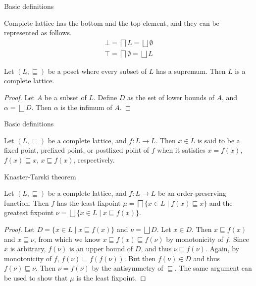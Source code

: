 \documentclass[9pt]{beamer}
\begin{document}
\begin{frame}{Basic definitions}
  \begin{lemma}
    Complete lattice has the bottom and the top element, and they can be represented as follows.
    $$
      \begin{aligned}
        \bot = \bigsqcap L         = \bigsqcup \emptyset \\
        \top = \bigsqcap \emptyset = \bigsqcup L
      \end{aligned}
    $$
  \end{lemma}

  \begin{lemma}
    Let $(L,\sqsubseteq)$ be a poset where every subset of $L$ has a supremum. Then $L$ is a complete lattice.
  \end{lemma}
  \begin{proof}
    Let $A$ be a subset of $L$.
    Define $D$ as the set of lower bounds of $A$, and $\alpha = \bigsqcup D$.
    Then $\alpha$ is the infimum of $A$.
  \end{proof}
\end{frame}

\begin{frame}{Basic definitions}
  \begin{definition}
    Let $(L,\sqsubseteq)$ be a complete lattice, and $f : L \to L$.
    Then $x \in L$ is said to be a fixed point, prefixed point, or postfixed point of $f$ when
    it satisfies $x = f(x)$, $f(x) \sqsubseteq x$, $x \sqsubseteq f(x)$, respectively.
  \end{definition}
\end{frame}

\begin{frame}{Knaster-Tarski theorem}
  \begin{lemma}
    Let $(L,\sqsubseteq)$ be a complete lattice, and $f : L \to L$ be an order-preserving function.
    Then $f$ has the least fixpoint $\mu = \bigsqcap \{x \in L \mid f(x) \sqsubseteq x\}$
    and the greatest fixpoint $\nu = \bigsqcup \{x \in L \mid x \sqsubseteq f(x)\}$.
  \end{lemma}
  \begin{proof}
    Let $D = \{x \in L \mid x \sqsubseteq f(x)\}$ and $\nu = \bigsqcup D$.
    Let $x \in D$.
    Then $x \sqsubseteq f(x)$ and $x \sqsubseteq \nu$, from which we know $x \sqsubseteq f(x) \sqsubseteq f(\nu)$ by monotonicity of $f$.
    Since $x$ is arbitrary, $f(\nu)$ is an upper bound of $D$, and thus $\nu \sqsubseteq f(\nu)$.
    Again, by monotonicity of $f$, $f(\nu) \sqsubseteq f(f(\nu))$.
    But then $f(\nu) \in D$ and thus $f(\nu) \sqsubseteq \nu$.
    Then $\nu = f(\nu)$ by the antisymmetry of $\sqsubseteq$.
    The same argument can be used to show that $\mu$ is the least fixpoint.
  \end{proof}
\end{frame}
\end{document}
